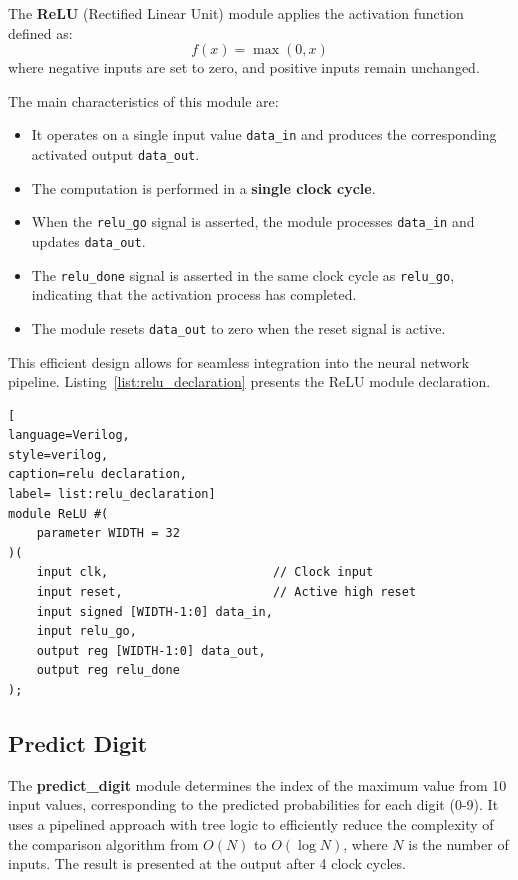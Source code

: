 \documentclass[11pt]{report}
\begin{document}
The \textbf{ReLU} (Rectified Linear Unit) module applies the activation function defined as:  
\[
f(x) = \max(0, x)
\]
where negative inputs are set to zero, and positive inputs remain unchanged.  

The main characteristics of this module are:  

\begin{itemize}
    \item It operates on a single input value \texttt{data\_in} and produces the corresponding activated output \texttt{data\_out}.
    \item The computation is performed in a \textbf{single clock cycle}.
    \item When the \texttt{relu\_go} signal is asserted, the module processes \texttt{data\_in} and updates \texttt{data\_out}.
    \item The \texttt{relu\_done} signal is asserted in the same clock cycle as \texttt{relu\_go}, indicating that the activation process has completed.
    \item The module resets \texttt{data\_out} to zero when the reset signal is active.
\end{itemize}  

This efficient design allows for seamless integration into the neural network pipeline.  
Listing~\ref{list:relu_declaration} presents the ReLU module declaration.

\begin{lstlisting}[
language=Verilog,
style=verilog,
caption=relu declaration,
label= list:relu_declaration]
module ReLU #( 
    parameter WIDTH = 32
)(
    input clk,                       // Clock input
    input reset,                     // Active high reset
    input signed [WIDTH-1:0] data_in,
    input relu_go,
    output reg [WIDTH-1:0] data_out,
    output reg relu_done
);
\end{lstlisting}

\subsection{Predict Digit}  

The \textbf{predict\_digit} module determines the index of the maximum value from 10 input values, corresponding to the predicted probabilities for each digit (0-9). It uses a pipelined approach with tree logic to efficiently reduce the complexity of the comparison algorithm from \( O(N) \) to \( O(\log N) \), where \( N \) is the number of inputs. The result is presented at the output after 4 clock cycles.
\end{document}
